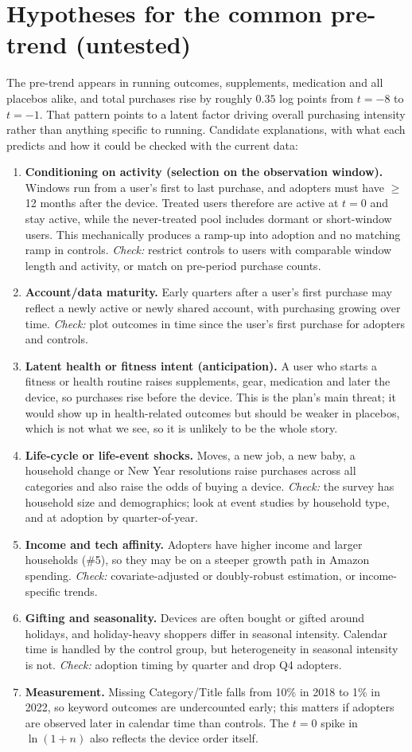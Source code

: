 \documentclass[11pt]{article}
\begin{document}
\section{Hypotheses for the common pre-trend (untested)}
The pre-trend appears in running outcomes, supplements, medication and all placebos alike, and total purchases rise by roughly $0.35$ log points from $t=-8$ to $t=-1$. That pattern points to a latent factor driving overall purchasing intensity rather than anything specific to running. Candidate explanations, with what each predicts and how it could be checked with the current data:
\begin{enumerate}[nosep]
\item \textbf{Conditioning on activity (selection on the observation window).} Windows run from a user's first to last purchase, and adopters must have $\geq$12 months after the device. Treated users therefore are active at $t=0$ and stay active, while the never-treated pool includes dormant or short-window users. This mechanically produces a ramp-up into adoption and no matching ramp in controls. \emph{Check:} restrict controls to users with comparable window length and activity, or match on pre-period purchase counts.
\item \textbf{Account/data maturity.} Early quarters after a user's first purchase may reflect a newly active or newly shared account, with purchasing growing over time. \emph{Check:} plot outcomes in time since the user's first purchase for adopters and controls.
\item \textbf{Latent health or fitness intent (anticipation).} A user who starts a fitness or health routine raises supplements, gear, medication and later the device, so purchases rise before the device. This is the plan's main threat; it would show up in health-related outcomes but should be weaker in placebos, which is not what we see, so it is unlikely to be the whole story.
\item \textbf{Life-cycle or life-event shocks.} Moves, a new job, a new baby, a household change or New Year resolutions raise purchases across all categories and also raise the odds of buying a device. \emph{Check:} the survey has household size and demographics; look at event studies by household type, and at adoption by quarter-of-year.
\item \textbf{Income and tech affinity.} Adopters have higher income and larger households (\#5), so they may be on a steeper growth path in Amazon spending. \emph{Check:} covariate-adjusted or doubly-robust estimation, or income-specific trends.
\item \textbf{Gifting and seasonality.} Devices are often bought or gifted around holidays, and holiday-heavy shoppers differ in seasonal intensity. Calendar time is handled by the control group, but heterogeneity in seasonal intensity is not. \emph{Check:} adoption timing by quarter and drop Q4 adopters.
\item \textbf{Measurement.} Missing Category/Title falls from 10\% in 2018 to 1\% in 2022, so keyword outcomes are undercounted early; this matters if adopters are observed later in calendar time than controls. The $t=0$ spike in $\ln(1+n)$ also reflects the device order itself.
\end{enumerate}
\end{document}
